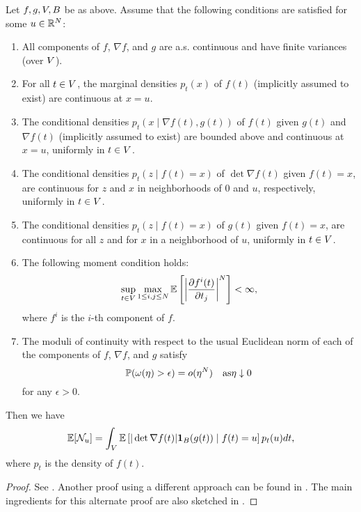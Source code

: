\begin{theorem}
	\label{thm: general kac-rice}
	Let \(f,g,V, B\) be as above. Assume that the following conditions are
	satisfied for some \(u\in\mathbb{R}^N\):	
	\begin{enumerate}[label={(\alph*)}]
		\item All components of \(f\), \(\nabla f\), and \(g\) are a.s. continuous
		and have finite variances (over \(V\)).
		\item For all \(t\in V\), the marginal densities \(p_t(x)\) of \(f(t)\)
		(implicitly assumed to exist) are continuous at \(x=u\).
		\item The conditional densities \(p_t(x\mid\nabla f(t), g(t))\) of \(f(t)\)
		given \(g(t)\) and \(\nabla f(t)\) (implicitly assumed to exist) are
		bounded above and continuous at \(x=u\), uniformly in \(t\in V\).
		\item The conditional densities \(p_t(z\mid f(t) = x)\) of \(\det \nabla f(t)\)
		given \(f(t)=x\), are continuous for \(z\) and \(x\) in neighborhoods of \(0\)
		and \(u\), respectively, uniformly in \(t\in V\).
		\item The conditional densities \(p_t(z\mid f(t) = x)\) of \(g(t)\)
		given \(f(t) = x\), are continuous for all \(z\) and for \(x\) in a
		neighborhood of \(u\), uniformly in \(t\in V\).
		\item The following moment condition holds:
		\[
			\sup_{t\in V}\max_{1\le i,j\le N} \mathbb{E}\left[
				\left|\frac{\partial f^i(t)}{\partial t_j}\right|^N
			\right] < \infty,
		\]
		where \(f^i\) is the \(i\)-th component of \(f\).
		\item The moduli of continuity with respect to the usual Euclidean norm
		of each of the components of \(f\), \(\nabla f\), and \(g\) satisfy
		\[
			\mathbb{P}(\omega(\eta) > \epsilon) = o(\eta^N) \quad\text{as} \eta\downarrow 0
		\]
		for any \(\epsilon>0\).
	\end{enumerate}
	Then we have
	\begin{equation}
		\mathbb{E}[\mathcal{N}_{u}] = \int_V \mathbb{E}\left[
			|\det \nabla f(t)| \mathbf{1}_B(g(t)) \mid f(t) = u
		\right] p_t(u)dt,
	\end{equation}
	where \(p_t\) is the density of \(f(t)\).	
\end{theorem}
\begin{proof}
	See \textcite[Section~11.2]{adlerRandomFieldsGeometry2007}. Another proof
	using a different approach can be found in
	\textcite[Theorem~6.4]{azaisLevelSetsExtrema2009}. The main ingredients for
	this alternate proof are also sketched in
	\textcite[Section~11.4]{adlerRandomFieldsGeometry2007}.
\end{proof}

